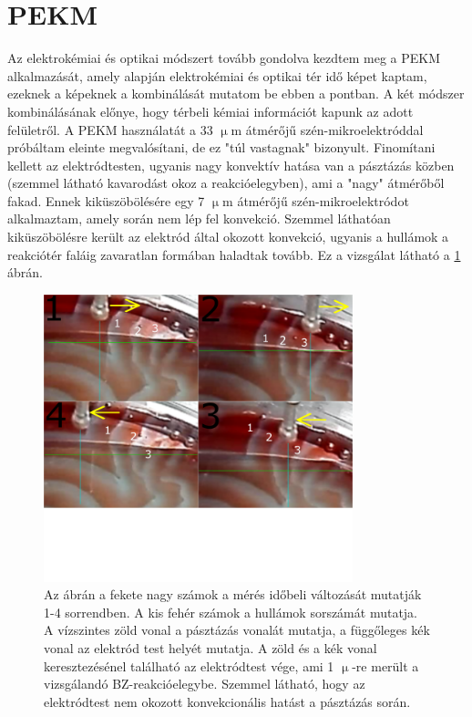 \section{PEKM}
Az elektrokémiai és optikai módszert tovább gondolva kezdtem meg a PEKM alkalmazását, amely alapján elektrokémiai és optikai tér idő képet kaptam, ezeknek a képeknek a kombinálását mutatom be ebben a pontban. A két módszer kombinálásának előnye, hogy térbeli kémiai információt kapunk az adott felületről.
A PEKM használatát a 33 $\upmu$m átmérőjű szén-mikroelektróddal próbáltam eleinte megvalósítani, de ez "túl vastagnak" bizonyult. Finomítani kellett az elektródtesten, ugyanis nagy konvektív hatása van a pásztázás közben (szemmel látható kavarodást okoz a reakcióelegyben), ami a "nagy" átmérőből fakad. Ennek kiküszöbölésére egy 7 $\upmu$m átmérőjű szén-mikroelektródot alkalmaztam, amely során nem lép fel konvekció. Szemmel láthatóan kiküszöbölésre került az elektród által okozott konvekció, ugyanis a hullámok a reakciótér faláig zavaratlan formában haladtak tovább. Ez a  vizsgálat látható a \ref{fig:secmkep} ábrán.
\begin{figure}[h]
\centering
\includegraphics[width=0.8\textwidth]{img/secmkep.png}
\caption{Az ábrán a fekete nagy számok a mérés időbeli változását mutatják 1-4 sorrendben. A kis fehér számok a hullámok sorszámát mutatja. A vízszintes zöld vonal a pásztázás vonalát mutatja, a függőleges kék vonal az elektród test helyét mutatja. A zöld és a kék vonal keresztezésénel található az elektródtest vége, ami 1 $\upmu$-re merült a vizsgálandó BZ-reakcióelegybe. Szemmel látható, hogy az elektródtest nem okozott konvekcionális hatást a pásztázás során.}
\label{fig:secmkep}
\end{figure}

